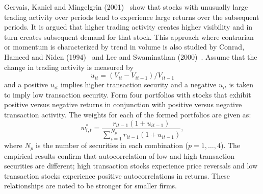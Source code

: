 Gervais, Kaniel and Mingelgrin (2001)~\cite{germing} show that stocks with unusually large trading activity over periods tend to experience large returns over the subsequent periods. It is argued that higher trading activity creates higher visibility and in turn creates subsequent demand for that stock. This approach where contrarian or momentum is characterized by trend in volume is also studied by Conrad, Hameed and Niden (1994)~\cite{conniden} and Lee and Swaminathan (2000)~\cite{lee2000}. Assume that the change in trading activity is measured by
	\begin{equation} \label{eqn:uit3}
	u_{it}= (V_{it} - V_{it-1}) / V_{it-1}
	\end{equation}   
and a positive $u_{it}$ implies higher transaction security and a negative $u_{it}$ is taken to imply low transaction security. Form four portfolios with stocks that exhibit positive versus negative returns in conjunction with positive versus negative transaction activity. The weights for each of the formed portfolios are given as:
	\begin{equation} \label{eqn:wip3}
	w^*_{i,t} = \dfrac{r_{it-1}(1+u_{it-1})}{\sum_{i=1}^{N_p} r_{it-1}(1+u_{it-1})},
	\end{equation}
where $N_p$ is the number of securities in each combination ($p=1, \ldots, 4$). The empirical results confirm that autocorrelation of low and high transaction securities are different; high transaction stocks experience price reversals and low transaction stocks experience positive autocorrelations in returns. These relationships are noted to be stronger for smaller firms. 



